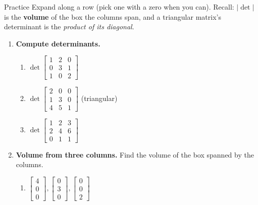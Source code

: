 \documentclass[10pt]{article}
\begin{document}
\namedateperiod

\vspace{0.12in}

\begin{notesbox}{Practice}
Expand along a row (pick one with a zero when you can). Recall: $|\det|$ is the \textbf{volume} of the
box the columns span, and a triangular matrix's determinant is the \emph{product of its diagonal}.

\begin{enumerate}[leftmargin=1.9em, itemsep=11pt]
  \item \textbf{Compute determinants.}
    \begin{enumerate}[label=(\alph*), leftmargin=1.8em, itemsep=5pt]
      \item $\det\begin{bmatrix} 1 & 2 & 0 \\ 0 & 3 & 1 \\ 1 & 0 & 2 \end{bmatrix}$ \hfill
      \item $\det\begin{bmatrix} 2 & 0 & 0 \\ 1 & 3 & 0 \\ 4 & 5 & 1 \end{bmatrix}$ \; {\footnotesize(triangular)} \hfill
      \item $\det\begin{bmatrix} 1 & 2 & 3 \\ 2 & 4 & 6 \\ 0 & 1 & 1 \end{bmatrix}$
    \end{enumerate}
    \vspace{1.3cm}
  \item \textbf{Volume from three columns.} Find the volume of the box spanned by the columns.
    \begin{enumerate}[label=(\alph*), leftmargin=1.8em, itemsep=5pt]
      \item $\begin{bmatrix} 4 \\ 0 \\ 0 \end{bmatrix}, \begin{bmatrix} 0 \\ 3 \\ 0 \end{bmatrix}, \begin{bmatrix} 0 \\ 0 \\ 2 \end{bmatrix}$ \hfill

\end{enumerate}
\end{enumerate}
\end{notesbox}
\end{document}
